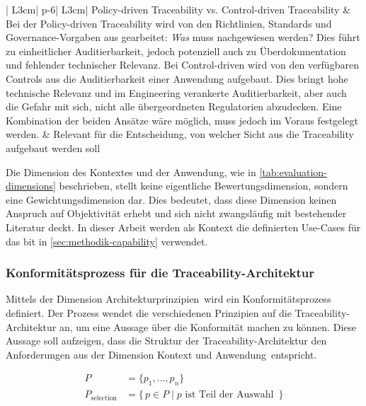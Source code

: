 \begin{longtable}{|
  L{3cm}|
  p{\dimexpr\textwidth-6cm-6\arrayrulewidth\relax}|
  L{3cm}|
}
    Policy-driven Traceability vs. Control-driven Traceability &
    Bei der Policy-driven Traceability wird von den Richtlinien, Standards und Governance-Vorgaben aus gearbeitet: \textit{Was} muss nachgewiesen werden? Dies führt zu einheitlicher Auditierbarkeit, jedoch potenziell auch zu Überdokumentation und fehlender technischer Relevanz. Bei Control-driven wird von den verfügbaren Controls aus die Auditierbarkeit einer Anwendung aufgebaut. Dies bringt hohe technische Relevanz und im Engineering verankerte Auditierbarkeit, aber auch die Gefahr mit sich, nicht alle übergeordneten Regulatorien abzudecken. Eine Kombination der beiden Ansätze wäre möglich, muss jedoch im Voraus festgelegt werden. &
    Relevant für die Entscheidung, von welcher Sicht aus die Traceability aufgebaut werden soll
    \\
    \hline
    \caption{Selbst definierte Trade-Off Dimensionen}
    \label{tab:tension-fields}
\end{longtable}

Die Dimension des Kontextes und der Anwendung, wie in \autoref{tab:evaluation-dimensions} beschrieben, stellt keine eigentliche Bewertungsdimension, sondern eine Gewichtungsdimension dar. Dies bedeutet, dass diese Dimension keinen Anspruch auf Objektivität erhebt und sich nicht zwangsläufig mit bestehender Literatur deckt. In dieser Arbeit werden als Kontext die definierten Use-Cases für das \ac{bit} in \autoref{sec:methodik-capability} verwendet.

\subsubsection{Konformitätsprozess für die Traceability-Architektur}
\label{sec:conformityprocess-architecture}

Mittels der Dimension \flqq Architekturprinzipien\frqq\ wird ein Konformitätsprozess definiert. Der Prozess wendet die verschiedenen Prinzipien auf die Traceability-Architektur an, um eine Aussage über die Konformität machen zu können. Diese Aussage soll aufzeigen, dass die Struktur der Traceability-Architektur den Anforderungen aus der Dimension \flqq Kontext und Anwendung\frqq\ entspricht.

\begin{align}
P &= \{p_1, \dots, p_n\} \\
P_{\text{selection}} &= \{\, p \in P \mid p \text{ ist Teil der Auswahl } \,\} \\ \\
\end{align}

